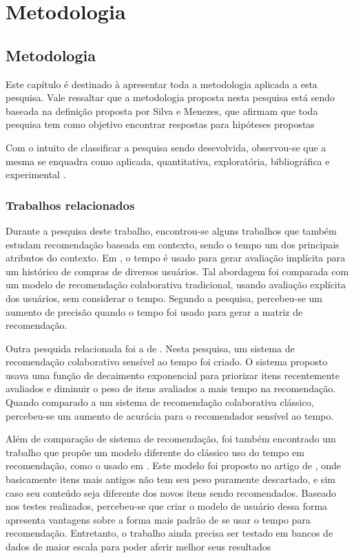 \part{Metodologia}

\chapter[Metodologia]{Metodologia}

Este capítulo é destinado à apresentar toda a metodologia aplicada a esta
pesquisa. Vale ressaltar que a metodologia proposta nesta pesquisa está sendo
baseada na definição proposta por Silva e Menezes, que afirmam que toda pesquisa
tem como objetivo encontrar respostas para hipóteses propostas
\cite{da2005metodologia}

Com o intuito de classificar a pesquisa sendo desevolvida, observou-se que a
mesma se enquadra como aplicada, quantitativa, exploratória, bibliográfica e
experimental \cite{da2005metodologia}.


\section{Trabalhos relacionados}

Durante a pesquisa deste trabalho, encontrou-se alguns trabalhos que também estudam recomendação baseada em contexto, sendo o tempo um dos
principais atributos do contexto. Em \cite{lee2008time}, o tempo é usado para gerar avaliação implícita para um histórico de
compras de diversos usuários. Tal abordagem foi comparada com um modelo de recomendação colaborativa tradicional, usando avaliação explícita dos usuários,
sem considerar o tempo. Segundo a pesquisa, percebeu-se um aumento de precisão quando o tempo foi usado para gerar a matriz de recomendação.

Outra pesquida relacionada foi a de \cite{ding2005time}. Nesta pesquisa, um
sistema de recomendação colaborativo sensível ao tempo foi criado. O sistema proposto usava uma função de
decaimento exponencial para priorizar itens recentemente avaliados e diminuir o peso de itens avaliados a mais tempo na recomendação. Quando comparado a um sistema de
recomendação colaborativa clássico, percebeu-se um aumento de acurácia para o recomendador sensível ao tempo.

Além de comparação de sistema de recomendação, foi também encontrado um trabalho que propõe um modelo diferente do clássico uso do tempo em recomendação, como o usado em
\cite{ding2005time}. Este modelo foi proposto no artigo de \cite{basile2015modeling}, onde basicamente itens mais antigos não tem seu peso puramente descartado, e sim caso
seu conteúdo seja diferente dos novos itens sendo recomendados. Baseado nos testes realizados, percebeu-se que criar o modelo de usuário dessa forma apresenta vantagens sobre
a forma mais padrão de se usar o tempo para recomendação. Entretanto, o trabalho ainda precisa ser testado em bancos de dados de maior escala para poder aferir melhor seus
resultados

